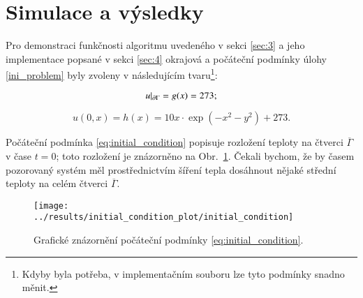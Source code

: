 \documentclass[11pt,american,czech]{article}
\newcommand*\midpoint[1]{\overline{#1}}
\begin{document}
\section{Simulace a výsledky}

Pro demonstraci funkčnosti algoritmu uvedeného v sekci \ref{sec:3} a jeho implementace popsané v sekci \ref{sec:4} okrajová a počáteční podmínky úlohy \eqref{ini_problem} byly zvoleny v následujícím tvaru\footnote{Kdyby byla potřeba, v implementačním souboru lze tyto podmínky snadno měnit.}: 

\begin{equation}\label{eq:boundary_condition}
	u\arrowvert_{\partial\Gamma}=g(x)=273;
\end{equation}

\begin{equation}\label{eq:initial_condition}
	u(0,x)=h(x)=10x\cdot\exp(-x^2-y^2)+273.
\end{equation}

Počáteční podmínka \eqref{eq:initial_condition} popisuje rozložení teploty na čtverci $\midpoint{\Gamma}$ v čase $t=0$; toto rozložení je znázorněno na Obr.~\ref{fig:initial_condition}. Čekali bychom, že by časem pozorovaný systém měl prostřednictvím šíření tepla dosáhnout nějaké střední teploty na celém čtverci $\midpoint{\Gamma}$. 

\begin{figure}
\centering
\texttt{[image: ../results/initial\_condition\_plot/initial\_condition]}
\caption{Grafické znázornění počáteční podmínky \eqref{eq:initial_condition}.}
\label{fig:initial_condition}
\end{figure}


\newpage{}



%

\end{document}
